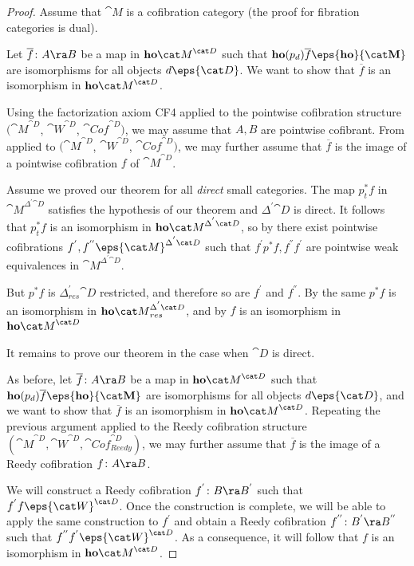 \begin{proof}
Assume that ${\cat M}$ is a cofibration category (the proof for fibration categories is dual).

Let $\overline{f} \colon A \ra B$ be a map in ${\bf ho}{\cat M}^{\cat D}$ such that ${\bf ho}(p_d)\overline{f} \eps {\bf ho}{\cat M}$ are isomorphisms for all objects $d \eps {\cat D}$. We want to show that $\overline{f}$ is an isomorphism in ${\bf ho}{\cat M}^{\cat D}$.

Using the factorization axiom CF4 applied to the pointwise cofibration structure $({\cat M}^{\cat D}$, ${\cat W}^{\cat D}$, ${\cat Cof}^{\cat D})$, we may assume that $A, B$ are pointwise cofibrant. From  applied to $({\cat M}^{\cat D}$, ${\cat W}^{\cat D}$, ${\cat Cof}^{\cat D})$, we may further assume that $\overline{f}$ is the image of a pointwise cofibration $f$ of ${\cat M}^{\cat D}$.

Assume we proved our theorem for all {\it direct} small categories. The map $p_t^*f$ in ${\cat M}^{\Delta^{'}{\cat D}}$ satisfies the hypothesis of our theorem and $\Delta^{'}{\cat D}$ is direct. It follows that $p_t^*f$ is an isomorphism in ${\bf ho}{\cat M}^{\Delta^{'}{\cat D}}$, so by  there exist pointwise cofibrations $f^{'}, f^{''} \eps {\cat M}^{\Delta^{'}{\cat D}}$ such that $f^{'}p^{*}f, f^{''}f^{'}$ are pointwise weak equivalences in ${\cat M}^{\Delta^{'}{\cat D}}$. 

But $p^{*}f$ is $\Delta^{'}_{res}{\cat D}$ restricted, and therefore so are $f^{'}$ and $f^{''}$. By the same  $p^{*}f$ is an isomorphism in ${\bf ho}{\cat M}^{\Delta^{'}{\cat D}}_{res}$, and by  $f$ is an isomorphism in ${\bf ho}{\cat M}^{{\cat D}}$

It remains to prove our theorem in the case when ${\cat D}$ is direct.

As before, let $\overline{f} \colon A \ra B$ be a map in ${\bf ho}{\cat M}^{\cat D}$ such that ${\bf ho}(p_d)\overline{f} \eps {\bf ho}{\cat M}$ are isomorphisms for all objects $d \eps {\cat D}$, and we want to show that $\overline{f}$ is an isomorphism in ${\bf ho}{\cat M}^{\cat D}$. Repeating the previous argument applied to the Reedy cofibration structure $({\cat M}^{\cat D}, {\cat W}^{\cat D}, {\cat Cof}^{\cat D}_{Reedy})$, we may further assume that $\overline{f}$ is the image of a Reedy cofibration $f \colon A \ra B$.  

We will construct a Reedy cofibration $f^{'} \colon B \ra B^{'}$ such that $f^{'}f \eps {\cat W}^{\cat D}$. Once the construction is complete, we will be able to apply the same construction to $f^{'}$ and obtain a Reedy cofibration $f^{''} \colon B^{'} \ra B^{''}$ such that $f^{''}f^{'} \eps {\cat W}^{\cat D}$. As a consequence, it will follow that $f$ is an isomorphism in ${\bf ho}{\cat M}^{\cat D}$.


\end{proof}
